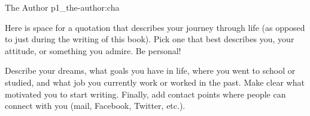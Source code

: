 


\begin{chapterpage}{
	{The Author}
}{p1_the-author:cha}

\vspace*{\fill}

\begin{center}


\end{center}
\vspace*{\fill}

\begin{myquotation} Here is space for a quotation that describes your journey through life (as opposed to just during the writing of this book). Pick one that best describes you, your attitude, or something you admire. Be personal!\end{myquotation}

\end{chapterpage}

Describe your dreams, what goals you have in life, where you went to school or studied, and what job you currently work or worked in the past. Make clear what motivated you to start writing. Finally, add contact points where people can connect with you (mail, Facebook, Twitter, etc.). 
